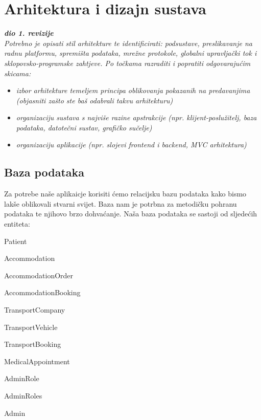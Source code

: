 \chapter{Arhitektura i dizajn sustava}
		
		\textbf{\textit{dio 1. revizije}}\\

		\textit{ Potrebno je opisati stil arhitekture te identificirati: podsustave, preslikavanje na radnu platformu, spremišta podataka, mrežne protokole, globalni upravljački tok i sklopovsko-programske zahtjeve. Po točkama razraditi i popratiti odgovarajućim skicama:}
	\begin{itemize}
		\item 	\textit{izbor arhitekture temeljem principa oblikovanja pokazanih na predavanjima (objasniti zašto ste baš odabrali takvu arhitekturu)}
		\item 	\textit{organizaciju sustava s najviše razine apstrakcije (npr. klijent-poslužitelj, baza podataka, datotečni sustav, grafičko sučelje)}
		\item 	\textit{organizaciju aplikacije (npr. slojevi frontend i backend, MVC arhitektura) }		
	\end{itemize}

	
		

		

				
		\section{Baza podataka}

			Za potrebe naše aplikaicje korisiti ćemo relacijsku bazu podataka kako bismo lakše oblikovali stvarni svijet. Baza nam je potrbna za metodičku pohranu podataka te njihovo brzo dohvaćanje. Naša baza podataka se sastoji od sljedećih entiteta:
			
			\begin{packed_item}
				\item Patient
				\item Accommodation
				\item AccommodationOrder
				\item AccommodationBooking
				\item TransportCompany
				\item TransportVehicle
				\item TransportBooking
				\item MedicalAppointment
				\item AdminRole
				\item AdminRoles
				\item Admin
			\end{packed_item}
		
